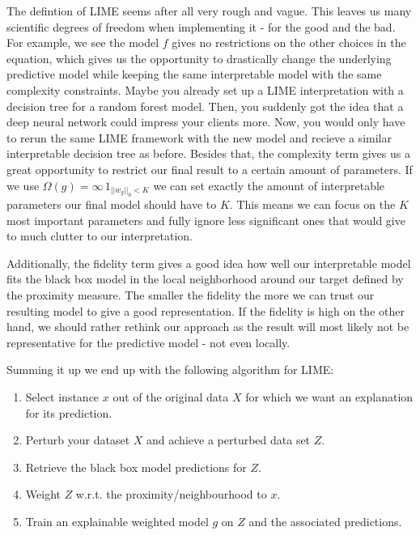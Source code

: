 \documentclass[]{krantz}
\begin{document}
The defintion of LIME seems after all very rough and vague. This leaves
us many scientific degrees of freedom when implementing it - for the
good and the bad. For example, we see the model \(f\) gives no
restrictions on the other choices in the equation, which gives us the
opportunity to drastically change the underlying predictive model while
keeping the same interpretable model with the same complexity
constraints. Maybe you already set up a LIME interpretation with a
decision tree for a random forest model. Then, you suddenly got the idea
that a deep neural network could impress your clients more. Now, you
would only have to rerun the same LIME framework with the new model and
recieve a similar interpretable decision tree as before. Besides that,
the complexity term gives us a great opportunity to restrict our final
result to a certain amount of parameters. If we use
\(\Omega(g) = \infty \, 1_{||w_g||_0<K}\) we can set exactly the amount
of interpretable parameters our final model should have to \(K\). This
means we can focus on the \(K\) most important parameters and fully
ignore less significant ones that would give to much clutter to our
interpretation.

Additionally, the fidelity term gives a good idea how well our
interpretable model fits the black box model in the local neighborhood
around our target defined by the proximity measure. The smaller the
fidelity the more we can trust our resulting model to give a good
representation. If the fidelity is high on the other hand, we should
rather rethink our approach as the result will most likely not be
representative for the predictive model - not even locally.

Summing it up we end up with the following algorithm for LIME:

\begin{enumerate}
\def\labelenumi{\arabic{enumi}.}
\item
  Select instance \(x\) out of the original data \(X\) for which we want
  an explanation for its prediction.
\item
  Perturb your dataset \(X\) and achieve a perturbed data set \(Z\).
\item
  Retrieve the black box model predictions for \(Z\).
\item
  Weight \(Z\) w.r.t. the proximity/neighbourhood to \(x\).
\item
  Train an explainable weighted model \(g\) on \(Z\) and the associated
  predictions.
\end{enumerate}
\end{document}
